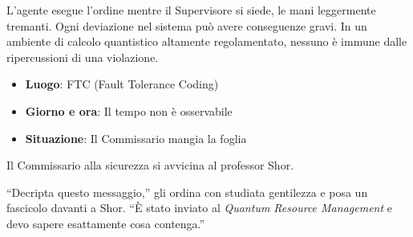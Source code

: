 L'agente esegue l'ordine mentre il Supervisore si siede, le mani leggermente tremanti. Ogni deviazione nel sistema può avere conseguenze gravi. In un ambiente di calcolo quantistico altamente regolamentato, nessuno è immune dalle ripercussioni di una violazione.
\begin{center}
\begin{minipage}{0.7\textwidth}
    \centering
\end{minipage}
\end{center}
\newpage   
\begin{tcolorbox}[colback=gray!5,colframe=gray!80,title=\textbf{Scheda Informativa}]
\begin{itemize}
    \item \textbf{Luogo}: FTC (Fault Tolerance Coding)
    \item \textbf{Giorno e ora}: Il tempo non è osservabile
    \item \textbf{Situazione}: Il Commissario mangia la foglia
\end{itemize}
\end{tcolorbox}

Il Commissario alla sicurezza si avvicina al professor Shor.

``Decripta questo messaggio,'' gli ordina con studiata gentilezza e posa un fascicolo davanti a Shor. ``È stato inviato al \textit{Quantum Resource Management} e devo sapere esattamente cosa contenga.''

